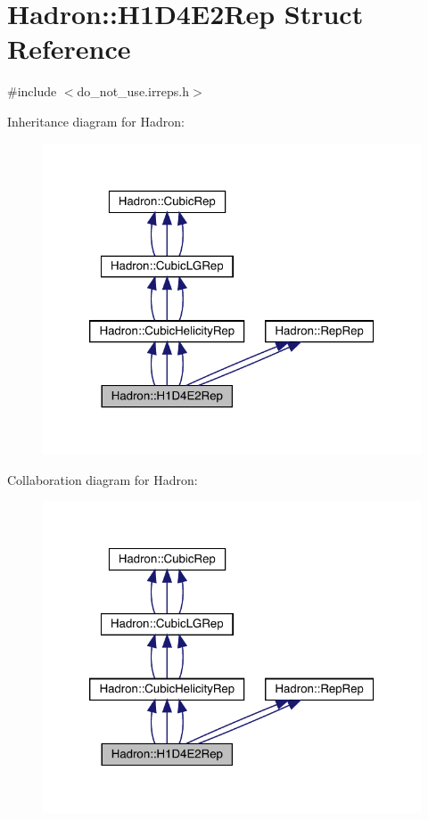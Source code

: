 \hypertarget{structHadron_1_1H1D4E2Rep}{}\section{Hadron\+:\+:H1\+D4\+E2\+Rep Struct Reference}
\label{structHadron_1_1H1D4E2Rep}


{\ttfamily \#include $<$do\+\_\+not\+\_\+use.\+irreps.\+h$>$}



Inheritance diagram for Hadron\+:
\nopagebreak
\begin{figure}[H]
\begin{center}
\leavevmode
\includegraphics[width=320pt]{d9/d1c/structHadron_1_1H1D4E2Rep__inherit__graph}
\end{center}
\end{figure}


Collaboration diagram for Hadron\+:
\nopagebreak
\begin{figure}[H]
\begin{center}
\leavevmode
\includegraphics[width=320pt]{dd/d6d/structHadron_1_1H1D4E2Rep__coll__graph}
\end{center}
\end{figure}

